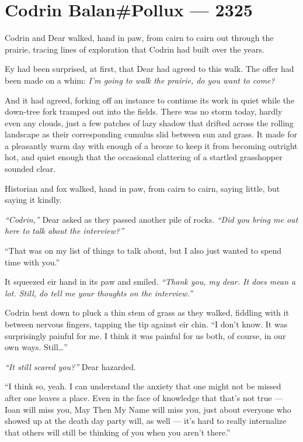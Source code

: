 \hypertarget{codrin-balanpollux-2325}{%
\chapter{Codrin Balan\#Pollux — 2325}\label{codrin-balanpollux-2325}}

Codrin and Dear walked, hand in paw, from cairn to cairn out through the prairie, tracing lines of exploration that Codrin had built over the years.

Ey had been surprised, at first, that Dear had agreed to this walk. The offer had been made on a whim: \emph{I'm going to walk the prairie, do you want to come?}

And it had agreed, forking off an instance to continue its work in quiet while the down-tree fork tramped out into the fields. There was no storm today, hardly even any clouds, just a few patches of lazy shadow that drifted across the rolling landscape as their corresponding cumulus slid between sun and grass. It made for a pleasantly warm day with enough of a breeze to keep it from becoming outright hot, and quiet enough that the occasional clattering of a startled grasshopper sounded clear.

Historian and fox walked, hand in paw, from cairn to cairn, saying little, but saying it kindly.

\emph{``Codrin,''} Dear asked as they passed another pile of rocks. \emph{``Did you bring me out here to talk about the interview?''}

``That was on my list of things to talk about, but I also just wanted to spend time with you.''

It squeezed eir hand in its paw and smiled. \emph{``Thank you, my dear. It does mean a lot. Still, do tell me your thoughts on the interview.''}

Codrin bent down to pluck a thin stem of grass as they walked, fiddling with it between nervous fingers, tapping the tip against eir chin. ``I don't know. It was surprisingly painful for me. I think it was painful for us both, of course, in our own ways. Still\ldots{}''

\emph{``It still scared you?''} Dear hazarded.

``I think so, yeah. I can understand the anxiety that one might not be missed after one leaves a place. Even in the face of knowledge that that's not true — Ioan will miss you, May Then My Name will miss you, just about everyone who showed up at the death day party will, as well — it's hard to really internalize that others will still be thinking of you when you aren't there.''

